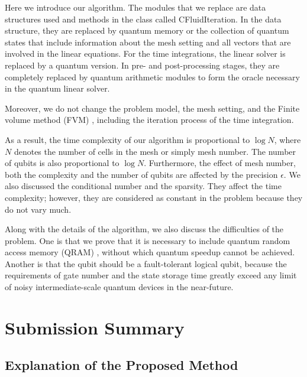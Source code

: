 \documentclass[%
 reprint,
 amsmath,amssymb,
pra,
]{revtex4-1}
\begin{document}
Here we introduce our algorithm. The modules that we replace are data structures used and methods in the class called CFluidIteration. In the data structure, they are replaced by quantum memory or the collection of quantum states that include information about the mesh setting and all vectors that are involved in the linear equations. For the time integrations, the linear solver is replaced by a quantum version. In pre- and post-processing stages, they are completely replaced by quantum arithmetic modules to form the oracle necessary in the quantum linear solver.

Moreover, we do not change the problem model, the mesh setting, and the Finite volume method (FVM) \cite{jameson1981numerical, eymard2000finite, ferziger2002computational, hirsch2007numerical, barth2018finite, herbin2019conservativity}, including the iteration process of the time integration.

As a result, the time complexity of our algorithm is proportional to $\log N$, where $N$ denotes the number of cells in the mesh or simply mesh number. The number of qubits is also proportional to $\log N$. Furthermore, the effect of mesh number, both the complexity and the number of qubits are affected by the precision $\epsilon$. We also discussed the conditional number and the sparsity. They affect the time complexity; however, they are considered as constant in the problem because they do not vary much.

Along with the details of the algorithm, we also discuss the difficulties of the problem. One is that we prove that it is necessary to include quantum random access memory (QRAM) \cite{giovannetti2008architectures, giovannetti2008quantum, moiseev2014multi, arunachalam2015robustness, naik2017random, park2019circuit,di2019fault,hann2019hardware}, without which quantum speedup cannot be achieved. Another is that the qubit should be a fault-tolerant logical qubit\cite{divincenzo1996fault, preskill1998fault, aharonov1999fault, steane1999efficient, bacon2000universal, raussendorf2007fault, benhelm2008towards, lund2008fault, chow2014implementing}, because the requirements of gate number and the state storage time greatly exceed any limit of noisy intermediate-scale quantum devices in the near-future.


\section{Submission Summary}

\subsection{Explanation of the Proposed Method}
\end{document}

